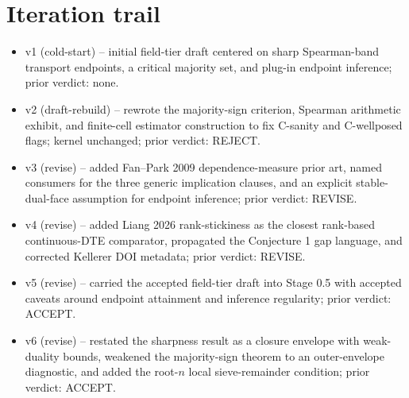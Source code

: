 \documentclass[11pt]{article}
\theoremstyle{definition}
\theoremstyle{plain}
\theoremstyle{remark}
\begin{document}
\section{Iteration trail}
\begin{itemize}[leftmargin=*]
\item v1 (cold-start) -- initial field-tier draft centered on sharp Spearman-band transport endpoints, a critical majority set, and plug-in endpoint inference; prior verdict: none.
\item v2 (draft-rebuild) -- rewrote the majority-sign criterion, Spearman arithmetic exhibit, and finite-cell estimator construction to fix C-sanity and C-wellposed flags; kernel unchanged; prior verdict: REJECT.
\item v3 (revise) -- added Fan--Park 2009 dependence-measure prior art, named consumers for the three generic implication clauses, and an explicit stable-dual-face assumption for endpoint inference; prior verdict: REVISE.
\item v4 (revise) -- added Liang 2026 rank-stickiness as the closest rank-based continuous-DTE comparator, propagated the Conjecture 1 gap language, and corrected Kellerer DOI metadata; prior verdict: REVISE.
\item v5 (revise) -- carried the accepted field-tier draft into Stage 0.5 with accepted caveats around endpoint attainment and inference regularity; prior verdict: ACCEPT.
\item v6 (revise) -- restated the sharpness result as a closure envelope with weak-duality bounds, weakened the majority-sign theorem to an outer-envelope diagnostic, and added the root-\(n\) local sieve-remainder condition; prior verdict: ACCEPT.
\end{itemize}
\end{document}
